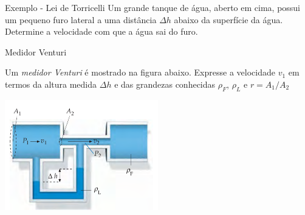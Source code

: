 \begin{frame}{Exemplo - Lei de Torricelli}
Um grande tanque de água, aberto em cima, possui um pequeno furo lateral a uma
distância $\Delta h$ abaixo da superfície da água. Determine a velocidade com
que a água sai do furo.
\end{frame}

\begin{frame}{Medidor Venturi}

Um \textit{medidor Venturi} é mostrado na figura abaixo. Expresse a velocidade
\(v_1\) em termos da altura medida \(\Delta h\) e das grandezas conhecidas
\(\rho_F\), \(\rho_L\) e \(r=A_1/A_2\)

\begin{center}
\includegraphics[width=0.5\textwidth]{images/venturi}
\end{center}
\end{frame}

